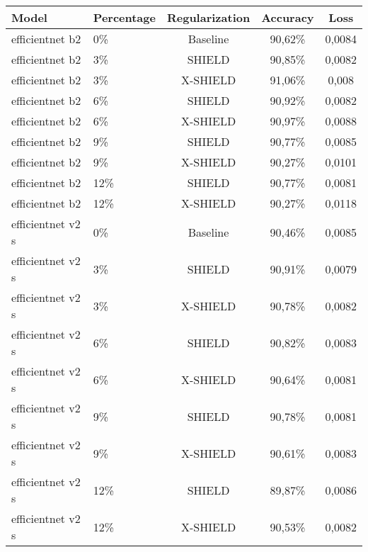 \begin{tabular}{llccc}
\toprule
Model & Percentage & Regularization & Accuracy & Loss \\
\midrule
efficientnet b2 & 0\% & Baseline & 90,62\% & 0,0084 \\
efficientnet b2 & 3\% & SHIELD & 90,85\% & 0,0082 \\
efficientnet b2 & 3\% & X-SHIELD & 91,06\% & 0,008 \\
efficientnet b2 & 6\% & SHIELD & 90,92\% & 0,0082 \\
efficientnet b2 & 6\% & X-SHIELD & 90,97\% & 0,0088 \\
efficientnet b2 & 9\% & SHIELD & 90,77\% & 0,0085 \\
efficientnet b2 & 9\% & X-SHIELD & 90,27\% & 0,0101 \\
efficientnet b2 & 12\% & SHIELD & 90,77\% & 0,0081 \\
efficientnet b2 & 12\% & X-SHIELD & 90,27\% & 0,0118 \\
efficientnet v2 s & 0\% & Baseline & 90,46\% & 0,0085 \\
efficientnet v2 s & 3\% & SHIELD & 90,91\% & 0,0079 \\
efficientnet v2 s & 3\% & X-SHIELD & 90,78\% & 0,0082 \\
efficientnet v2 s & 6\% & SHIELD & 90,82\% & 0,0083 \\
efficientnet v2 s & 6\% & X-SHIELD & 90,64\% & 0,0081 \\
efficientnet v2 s & 9\% & SHIELD & 90,78\% & 0,0081 \\
efficientnet v2 s & 9\% & X-SHIELD & 90,61\% & 0,0083 \\
efficientnet v2 s & 12\% & SHIELD & 89,87\% & 0,0086 \\
efficientnet v2 s & 12\% & X-SHIELD & 90,53\% & 0,0082 \\
\bottomrule
\end{tabular}
